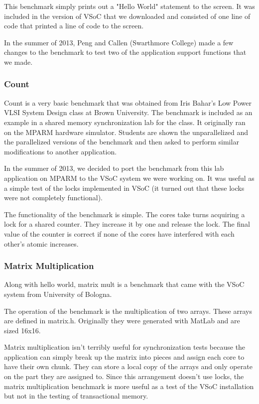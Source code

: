 \documentclass{article}
\begin{document}
This benchmark simply prints out a "Hello World" statement to the screen. It 
was included in the version of VSoC that we downloaded and consisted of one 
line of code that printed a line of code to the screen. 

In the summer of 2013, Peng and Callen (Swarthmore College) made a few changes 
to the benchmark to test two of the application support functions that we made. 

\subsubsection{Count}

Count is a very basic benchmark that was obtained from Iris Bahar's Low Power 
VLSI System Design class at Brown University. The benchmark is included as an 
example in a shared memory synchronization lab for the class. It originally 
ran on the MPARM hardware simulator. Students are shown the unparallelized and 
the parallelized versions of the benchmark and then asked to perform similar 
modifications to another application. 

In the summer of 2013, we decided to port the benchmark from this lab 
application on MPARM to the VSoC system we were working on.  It was useful as 
a simple test of the locks implemented in VSoC (it turned out that these locks 
were not completely functional).

The functionality of the benchmark is simple. The cores take turns acquiring a 
lock for a shared counter. They increase it by one and release the lock. The 
final value of the counter is correct if none of the cores have interfered 
with each other's atomic increases.

\subsubsection{Matrix Multiplication}

Along with hello world, matrix mult is a benchmark that came with the VSoC 
system from University of Bologna. 

The operation of the benchmark is the multiplication of two arrays. These 
arrays are defined in matrix.h. Originally they were generated with MatLab and 
are sized 16x16. 

Matrix multiplication isn't terribly useful for synchronization tests because 
the application can simply break up the matrix into pieces and assign each 
core to have their own chunk.  They can store a local copy of the arrays and 
only operate on the part they are assigned to. Since this arrangement doesn't 
use locks, the matrix multiplication benchmark is more useful as a test of the 
VSoC installation but not in the testing of transactional memory. 
\end{document}
